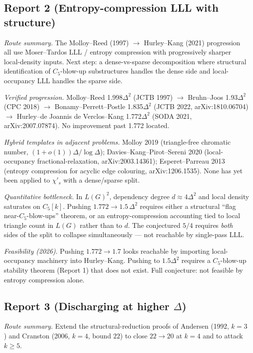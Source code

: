 \documentclass[11pt]{article}
\newcommand{\sci}{\chi'_s}
\begin{document}
\subsection*{Report 2 (Entropy-compression LLL with structure)}

\emph{Route summary.} The Molloy--Reed (1997) $\to$ Hurley--Kang
(2021) progression all use Moser--Tardos LLL / entropy compression
with progressively sharper local-density inputs. Next step: a
dense-vs-sparse decomposition where structural identification of
$C_5$-blow-up substructures handles the dense side and
local-occupancy LLL handles the sparse side.

\emph{Verified progression.} Molloy--Reed 1.998$\Delta^2$ (JCTB
1997) $\to$ Bruhn--Joos 1.93$\Delta^2$ (CPC 2018) $\to$
Bonamy--Perrett--Postle 1.835$\Delta^2$ (JCTB 2022,
arXiv:1810.06704) $\to$ Hurley--de Joannis de Verclos--Kang
1.772$\Delta^2$ (SODA 2021, arXiv:2007.07874). No improvement past
1.772 located.

\emph{Hybrid templates in adjacent problems.} Molloy 2019
(triangle-free chromatic number, $(1+o(1))\Delta/\log\Delta$);
Davies--Kang--Pirot--Sereni 2020 (local-occupancy
fractional-relaxation, arXiv:2003.14361); Esperet--Parreau 2013
(entropy compression for acyclic edge colouring,
arXiv:1206.1535). None has yet been applied to $\sci$ with a
dense/sparse split.

\emph{Quantitative bottleneck.} In $L(G)^2$, dependency degree
$d \approx 4\Delta^2$ and local density saturates on $C_5[k]$.
Pushing $1.772 \to 1.5\,\Delta^2$ requires either a structural
``flag near-$C_5$-blow-ups'' theorem, or an entropy-compression
accounting tied to local triangle count in $L(G)$ rather than to $d$.
The conjectured $5/4$ requires \emph{both} sides of the split to
collapse simultaneously --- not reachable by single-pass LLL.

\emph{Feasibility (2026).} Pushing $1.772 \to 1.7$ looks reachable by
importing local-occupancy machinery into Hurley--Kang.
Pushing to $1.5\Delta^2$ requires a $C_5$-blow-up stability theorem
(Report 1) that does not exist. Full conjecture: not feasible by
entropy compression alone.

\subsection*{Report 3 (Discharging at higher $\Delta$)}

\emph{Route summary.} Extend the structural-reduction proofs of
Andersen (1992, $k=3$) and Cranston (2006, $k=4$, bound $22$) to
close $22\to20$ at $k=4$ and to attack $k \geq 5$.
\end{document}
